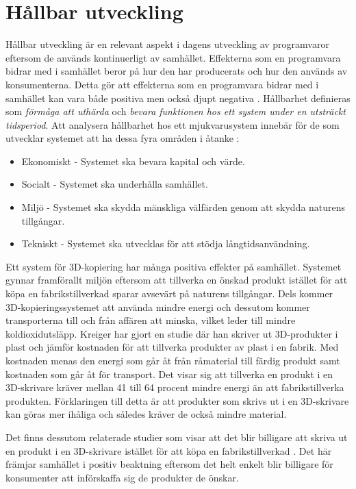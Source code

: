 \section{Hållbar utveckling}
Hållbar utveckling är en relevant aspekt i dagens utveckling av programvaror eftersom de används kontinuerligt av samhället. Effekterna som en programvara bidrar med i samhället beror på hur den har producerats och hur den används av konsumenterna. Detta gör att effekterna som en programvara bidrar med i samhället kan vara både positiva men också djupt negativa \cite{raturi2014developing}. Hållbarhet definieras som \textit{förmåga att uthärda} och \textit{bevara funktionen hos ett system under en utsträckt tidsperiod}. Att analysera hållbarhet hos ett mjukvarusystem innebär för de som utvecklar systemet att ha dessa fyra områden i åtanke \cite{lago2015framing}:

\begin{itemize}
	\item Ekonomiskt -  Systemet ska bevara kapital och värde.
	\item Socialt - Systemet ska underhålla samhället.
	\item Miljö - Systemet ska skydda mänskliga välfärden genom att skydda naturens tillgångar.
	\item Tekniskt - Systemet ska utvecklas för att stödja långtidsanvändning.
\end{itemize}

Ett system för 3D-kopiering har många positiva effekter på samhället. Systemet gynnar framförallt miljön eftersom att tillverka en önskad produkt istället för att köpa en fabrikstillverkad sparar avsevärt på naturens tillgångar. Dels kommer 3D-kopieringssystemet att använda mindre energi och dessutom kommer transporterna till och från affären att minska, vilket leder till mindre koldioxidutsläpp. Kreiger \cite{kreiger2013environmental} har gjort en studie där han skriver ut 3D-produkter i plast och jämför kostnaden för att tillverka produkter av plast i en fabrik. Med kostnaden menas den energi som går åt från råmaterial till färdig produkt samt kostnaden som går åt för transport. Det visar sig att tillverka en produkt i en 3D-skrivare kräver mellan 41 till 64 procent mindre energi än att fabrikstillverka produkten. Förklaringen till detta är att produkter som skrivs ut i en 3D-skrivare kan göras mer ihåliga och således kräver de också mindre material. 

Det finns dessutom relaterade studier som visar att det blir billigare att skriva ut en produkt i en 3D-skrivare istället för att köpa en fabrikstillverkad \cite{wittbrodt2013life}. Det här främjar samhället i positiv beaktning eftersom det helt enkelt blir billigare för konsumenter att införskaffa sig de produkter de önskar. 

